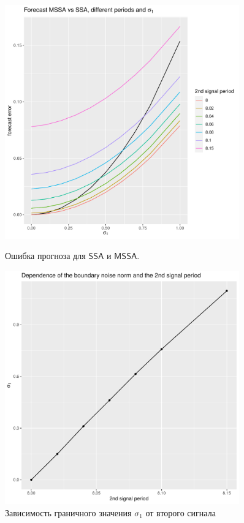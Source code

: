 \documentclass[specialist, substylefile = spbureport.rtx,
    subf,href,colorlinks=true, 12pt]{disser}
\newcommand{\SSA}{\mathsf{SSA}}
\newcommand{\MSSA}{\mathsf{MSSA}}
\begin{document}
        \begin{figure}[h]
            \centering
            \begin{minipage}{.5\textwidth}
                \centering
                \includegraphics[width=0.9\textwidth]{experiment_2_cos1.pdf}
                \caption{Ошибка прогноза для $\SSA$ и $\MSSA$.}
                \label{fig:exp2_cos1}
            \end{minipage}%
            \begin{minipage}{.5\textwidth}
                \centering
            \includegraphics[width=0.9\textwidth]{experiment_2_cos2.pdf}
            \caption{Зависимость граничного значения $\sigma_1$ от второго сигнала}
            \label{fig:exp2_cos2}
            \end{minipage}
        \end{figure}
\end{document}
